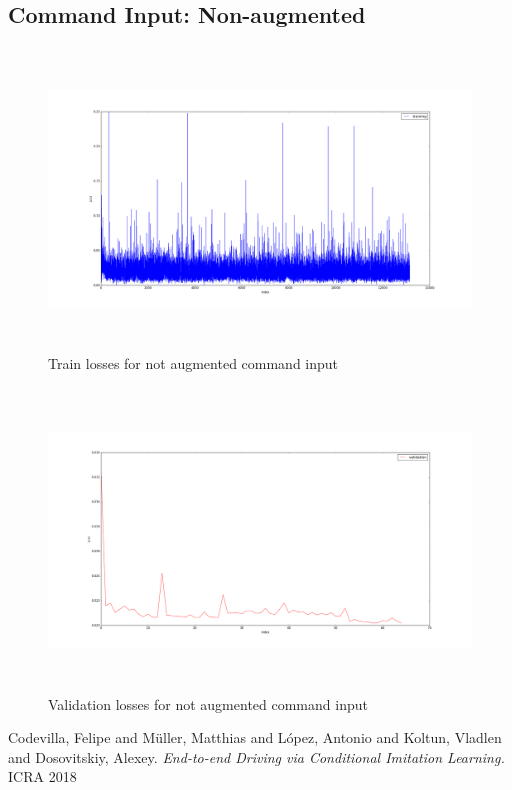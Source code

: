 \documentclass[a4paper]{article}
\begin{document}



\clearpage
\subsection{Command Input: Non-augmented}

  \begin{figure}[H]
    \centering
    \includegraphics[width=\textwidth, height=8cm]{../pics/command_input_nonaugmented_training.png}
    \caption{Train losses for not augmented command input}
    \label{fig:non_augmented_train_loss}
  \end{figure}

  \begin{figure}[H]
    \centering
    \includegraphics[width=\textwidth, height=8cm]{../pics/command_input_nonaugmented_validation.png}
    \caption{Validation losses for not augmented command input}
    \label{fig:non_augmented_val_loss}
  \end{figure}


\begin{thebibliography}{9}
Codevilla, Felipe and Müller, Matthias and López, Antonio and Koltun, Vladlen
and Dosovitskiy, Alexey.
\textit{End-to-end Driving via Conditional Imitation Learning.}
ICRA 2018
\end{thebibliography}
\end{document}
